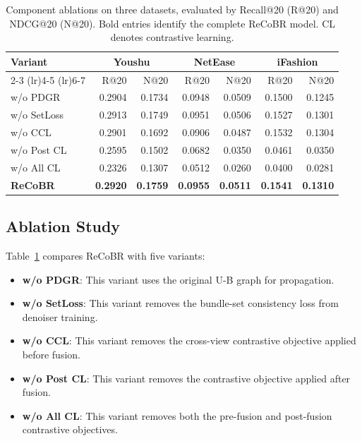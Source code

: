 \documentclass[letterpaper,journal]{IEEEtran}
\begin{document}
\begin{table}[!htb]
    \centering
    \caption{Component ablations on three datasets, evaluated by
    Recall@20 (R@20) and NDCG@20 (N@20). Bold entries identify
    the complete ReCoBR model. CL denotes contrastive learning.}
    \label{tab:ablation}
    {\small
    \setlength{\tabcolsep}{2pt}
    \begin{tabular}{@{}lrrrrrr@{}}
        \toprule
        \multirow{2}{*}{Variant}
        & \multicolumn{2}{c}{Youshu}
        & \multicolumn{2}{c}{NetEase}
        & \multicolumn{2}{c}{iFashion} \\
        \cmidrule(lr){2-3}
        \cmidrule(lr){4-5}
        \cmidrule(lr){6-7}
        & R@20 & N@20
        & R@20 & N@20
        & R@20 & N@20 \\
        \midrule

        w/o PDGR
        & 0.2904 & 0.1734
        & 0.0948 & 0.0509
        & 0.1500 & 0.1245 \\

        w/o SetLoss
        & 0.2913 & 0.1749
        & 0.0951 & 0.0506
        & 0.1527 & 0.1301 \\

        w/o CCL
        & 0.2901 & 0.1692
        & 0.0906 & 0.0487
        & 0.1532 & 0.1304 \\

        w/o Post CL
        & 0.2595 & 0.1502
        & 0.0682 & 0.0350
        & 0.0461 & 0.0350 \\

        w/o All CL
        & 0.2326 & 0.1307
        & 0.0512 & 0.0260
        & 0.0400 & 0.0281 \\
        \midrule

        \textbf{ReCoBR}
        & \textbf{0.2920}
        & \textbf{0.1759}
        & \textbf{0.0955}
        & \textbf{0.0511}
        & \textbf{0.1541}
        & \textbf{0.1310} \\

        \bottomrule
    \end{tabular}
    }
\end{table}

\newpage
\subsection{Ablation Study}

Table~\ref{tab:ablation} compares ReCoBR with five variants:
\begin{itemize}
\item \textbf{w/o PDGR}: This variant uses the original U-B graph for propagation.
\item \textbf{w/o SetLoss}: This variant removes the bundle-set consistency loss from denoiser training.
\item \textbf{w/o CCL}: This variant removes the cross-view contrastive objective applied before fusion.
\item \textbf{w/o Post CL}: This variant removes the contrastive objective applied after fusion.
\item \textbf{w/o All CL}: This variant removes both the pre-fusion and post-fusion contrastive objectives.
\end{itemize}
\end{document}
